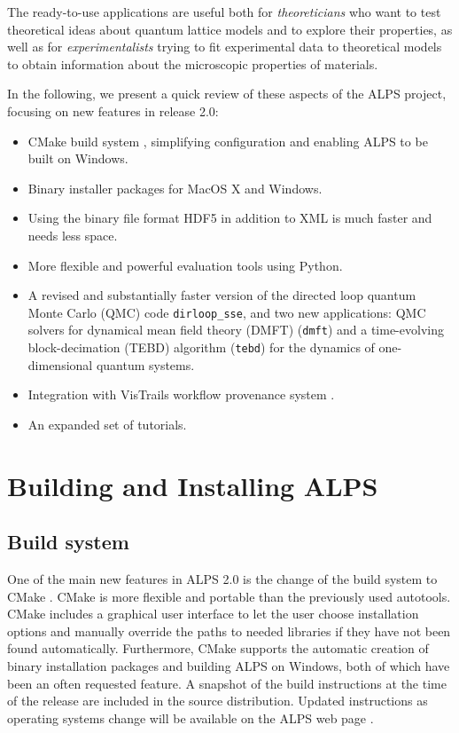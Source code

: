 \documentclass[12pt]{iopart}
\begin{document}
The ready-to-use applications are useful both for 
{\it theoreticians} who want to test theoretical ideas about quantum
lattice models and to explore their properties, as well as for 
{\it experimentalists} trying to fit experimental data to theoretical
models to obtain information about the microscopic properties of
materials.

 In the following, we present a quick review of these
 aspects of the ALPS project, focusing on new features in release 2.0:
 
 \begin{itemize}
\item CMake build system \cite{cmake}, simplifying configuration and enabling ALPS to be built on  Windows.
\item Binary installer packages for MacOS X and Windows.
\item Using the binary file format HDF5 \cite{hdf5} in addition to XML is much faster and needs less space.
\item More flexible and powerful evaluation tools using Python.
\item A revised and substantially faster version of the directed loop quantum Monte Carlo (QMC) code {\tt dirloop\_sse}, and two new applications: QMC solvers for dynamical 
mean field theory (DMFT) ({\tt dmft}) and a time-evolving block-decimation (TEBD) algorithm ({\tt tebd}) for the dynamics of one-dimensional quantum systems.
\item Integration with VisTrails workflow provenance system \cite{vistrails}.
\item An expanded set of tutorials.
 \end{itemize}
 
 
\section{Building and Installing ALPS}
\subsection{Build system}
One of the main new features in ALPS 2.0 is the change of the build system to CMake \cite{cmake}. CMake is more flexible and portable than the previously used autotools. CMake includes a graphical user interface to let the user choose installation options and manually override the paths to needed libraries if they have not been found automatically. Furthermore,  CMake supports the automatic creation of binary installation packages and building ALPS on Windows, both of which have been an often requested feature. A snapshot of the build instructions at the time of the release are included in the source distribution. Updated instructions as operating systems change will be available on the ALPS web page \cite{alps}.
\end{document}
